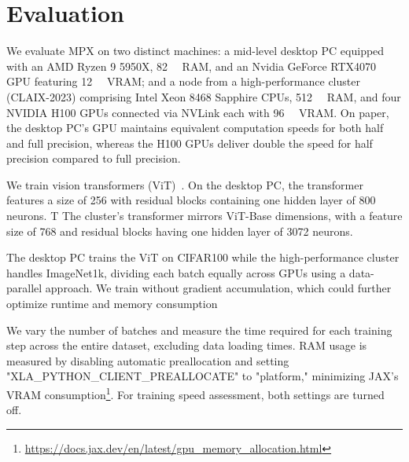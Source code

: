 \documentclass[10pt, a4paper, logo, onecolumn, internal, copyright]{dsme}
\newcommand{\mpx}{\textsc{MPX}}
\begin{document}
\section{Evaluation}
We evaluate \mpx{} on two distinct machines: a mid-level desktop PC equipped with an AMD Ryzen 9 5950X, \qty{82}{\giga\byte} RAM, and an Nvidia GeForce RTX4070 GPU featuring \qty{12}{\giga\byte} VRAM; and a node from a high-performance cluster (CLAIX-2023) comprising Intel Xeon 8468 Sapphire CPUs, \qty{512}{\giga\byte} RAM, and four NVIDIA H100 GPUs connected via NVLink each with \qty{96}{\giga\byte} VRAM. 
On paper, the desktop PC's GPU maintains equivalent computation speeds for both half and full precision, whereas the H100 GPUs deliver double the speed for half precision compared to full precision.

We train vision transformers (ViT)~\cite{dosovitskiy2020image,steiner2021train}. On the desktop PC, the transformer features a size of 256 with residual blocks containing one hidden layer of 800 neurons. T
The cluster's transformer mirrors ViT-Base dimensions, with a feature size of 768 and residual blocks having one hidden layer of 3072 neurons.

The desktop PC trains the ViT on CIFAR100 while the high-performance cluster handles ImageNet1k, dividing each batch equally across GPUs using a data-parallel approach. We train without gradient accumulation, which could further optimize runtime and memory consumption

We vary the number of batches and measure the time required for each training step across the entire dataset, excluding data loading times. 
RAM usage is measured by disabling automatic preallocation and setting "XLA\_PYTHON\_CLIENT\_PREALLOCATE" to "platform," minimizing JAX's VRAM consumption\footnote{\url{https://docs.jax.dev/en/latest/gpu_memory_allocation.html}}. 
For training speed assessment, both settings are turned off.
\end{document}
